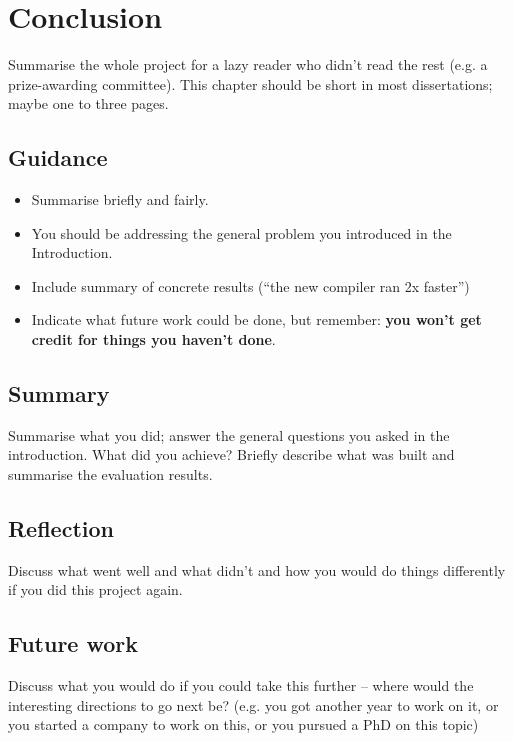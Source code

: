 \documentclass{l4proj}
\begin{document}
\chapter{Conclusion}
Summarise the whole project for a lazy reader who didn't read the rest (e.g. a prize-awarding committee). This chapter should be short in most dissertations; maybe one to three pages.
\section{Guidance}
\begin{itemize}
      \item
            Summarise briefly and fairly.
      \item
            You should be addressing the general problem you introduced in the
            Introduction.
      \item
            Include summary of concrete results (``the new compiler ran 2x
            faster'')
      \item
            Indicate what future work could be done, but remember: \textbf{you
                  won't get credit for things you haven't done}.
\end{itemize}

\section{Summary}
Summarise what you did; answer the general questions you asked in the introduction. What did you achieve? Briefly describe what was built and summarise the evaluation results.

\section{Reflection}
Discuss what went well and what didn't and how you would do things differently if you did this project again.

\section{Future work}
Discuss what you would do if you could take this further -- where would the interesting directions to go next be? (e.g. you got another year to work on it, or you started a company to work on this, or you pursued a PhD on this topic)
\end{document}
